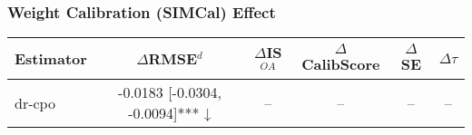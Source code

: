 \subsubsection{Weight Calibration (SIMCal) Effect}
\begin{tabular}{l|ccccc}
\toprule
Estimator & $\Delta$RMSE$^d$ & $\Delta$IS$^{OA}$ & $\Delta$CalibScore & $\Delta$SE & $\Delta\tau$ \\
\midrule
dr-cpo & -0.0183 [-0.0304, -0.0094]*** ↓ & -- & -- & -- & -- \\
\bottomrule
\end{tabular}
